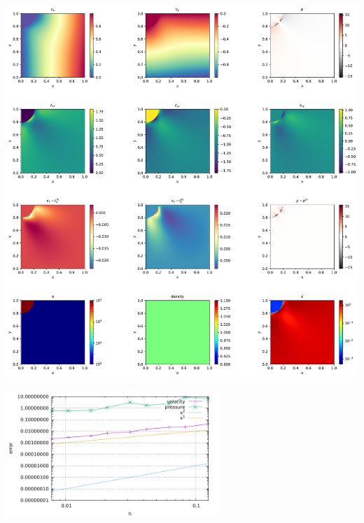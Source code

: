 \includegraphics[width=15cm]{python_codes/fieldstone_solvi/solution}


\includegraphics[width=8cm]{python_codes/fieldstone_solvi/errors}
